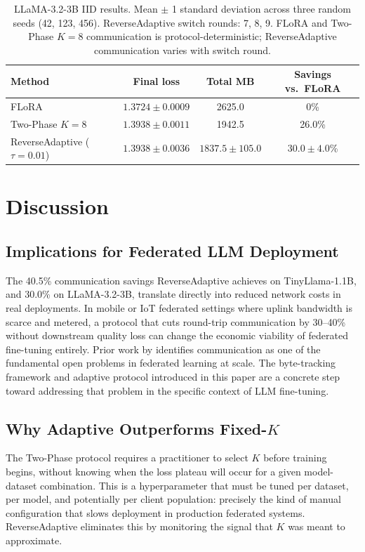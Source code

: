 \begin{table}[t]
\caption{LLaMA-3.2-3B IID results. Mean $\pm$ 1 standard deviation across three random seeds (42, 123, 456). ReverseAdaptive switch rounds: 7, 8, 9. FLoRA and Two-Phase $K{=}8$ communication is protocol-deterministic; ReverseAdaptive communication varies with switch round.}
\label{tab:llama_iid}
\begin{center}
\begin{tabular}{lccc}
\toprule
Method & Final loss & Total MB & Savings vs.\ FLoRA \\
\midrule
FLoRA & $1.3724 \pm 0.0009$ & 2625.0 & 0\% \\
Two-Phase $K{=}8$ & $1.3938 \pm 0.0011$ & 1942.5 & 26.0\% \\
ReverseAdaptive ($\tau{=}0.01$) & $1.3938 \pm 0.0036$ & $1837.5 \pm 105.0$ & $30.0 \pm 4.0$\% \\
\bottomrule
\end{tabular}
\end{center}
\end{table}

\section{Discussion}
\label{sec:discussion}

\subsection{Implications for Federated LLM Deployment}
The 40.5\% communication savings ReverseAdaptive achieves on TinyLlama-1.1B, and 30.0\% on LLaMA-3.2-3B, translate directly into reduced network costs in real deployments. In mobile or IoT federated settings where uplink bandwidth is scarce and metered, a protocol that cuts round-trip communication by 30--40\% without downstream quality loss can change the economic viability of federated fine-tuning entirely. Prior work by \citet{kairouz2021advances} identifies communication as one of the fundamental open problems in federated learning at scale. The byte-tracking framework and adaptive protocol introduced in this paper are a concrete step toward addressing that problem in the specific context of LLM fine-tuning.

\subsection{Why Adaptive Outperforms Fixed-$K$}
The Two-Phase protocol requires a practitioner to select $K$ before training begins, without knowing when the loss plateau will occur for a given model-dataset combination. This is a hyperparameter that must be tuned per dataset, per model, and potentially per client population: precisely the kind of manual configuration that slows deployment in production federated systems. ReverseAdaptive eliminates this by monitoring the signal that $K$ was meant to approximate.


